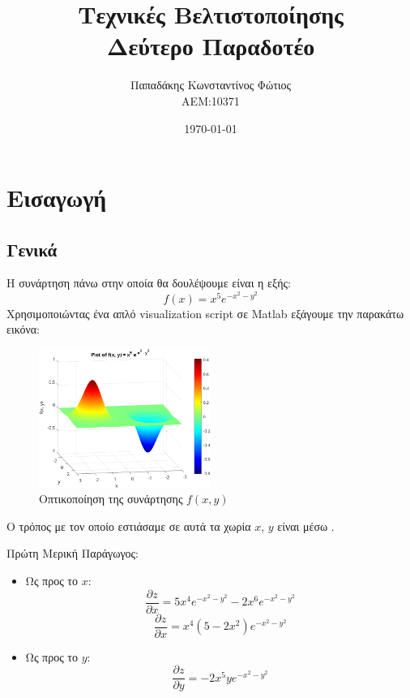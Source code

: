 \documentclass{report}
\begin{document}

\title{\Huge \bfseries Τεχνικές Βελτιστοποίησης \\ Δεύτερο Παραδοτέο} %
\author{Παπαδάκης Κωνσταντίνος Φώτιος\vspace{0.5cm} \\  ΑΕΜ:10371} %
\date{\today}
\maketitle

\tableofcontents

\chapter{Εισαγωγή}
\section{Γενικά}
Η συνάρτηση πάνω στην οποία θα δουλέψουμε είναι η εξής:
$$f(x) = x^5 e^{-x^2-y^2}$$
Χρησιμοποιώντας ένα απλό visualization script σε Matlab εξάγουμε την παρακάτω εικόνα:
\begin{figure}[H]
    \centering
    \includegraphics[width=0.5\textwidth]{media/visualization.png}
    \caption{Οπτικοποίηση της συνάρτησης $f(x,y)$}
\end{figure}
Ο τρόπος με τον οποίο εστιάσαμε σε αυτά τα χωρία $x$, $y$ είναι μέσω . 

Πρώτη Μερική Παράγωγος:
\begin{itemize}
    \item Ως προς το $x$:
    $$\frac{\partial{z}}{\partial{x}} = 5x^4e^{-x^2-y^2} - 2x^6e^{-x^2-y^2}$$
    $$\frac{\partial{z}}{\partial{x}} = x^4(5-2x^2)e^{-x^2-y^2}$$
    \item Ως προς το $y$:
    $$\frac{\partial{z}}{\partial{y}} = -2x^{5}ye^{-x^2-y^2}$$

\end{itemize}
\end{document}
